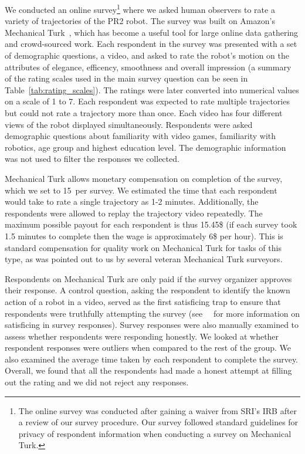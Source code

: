 \documentclass[letterpaper, 10 pt, conference]{ieeeconf}  %
\begin{document}
We conducted an online survey\footnote{The online survey was conducted after gaining a waiver from SRI's IRB after a review of our survey procedure. Our survey followed standard guidelines for privacy of respondent information when conducting a survey on Mechanical Turk.} where we asked human observers to rate a variety of trajectories of the PR2 robot. The survey was built on Amazon's Mechanical Turk~\cite{paolacci2010running}, which has become a useful tool for large online data gathering and crowd-sourced work. Each respondent in the survey was presented with a set of demographic questions, a video, and asked to rate the robot's motion on the attributes  of elegance, efficency, smoothness and overall impression (a summary of the rating scales used in the main survey question can be seen in Table~\ref{tab:rating_scales}). The ratings were later converted into numerical values on a scale of 1 to 7. Each respondent was expected to rate multiple trajectories but could not rate a trajectory more than once. Each video has four different views of the robot displayed simultaneously. Respondents were asked demographic questions about familiarity with video games, familiarity with robotics, age group and highest education level. The demographic information was not used to filter the responses we collected.  

Mechanical Turk allows monetary compensation on completion of the survey, which we set to 15\textcent~per survey. We estimated the time that each respondent would take to rate a single trajectory as 1-2 minutes. Additionally, the respondents were allowed to replay the trajectory video repeatedly. The maximum possible payout for each respondent is thus 15.45\$ (if each survey took 1.5 minutes to complete then the wage is approximately 6\$ per hour). This is standard compensation for quality work on Mechanical Turk for tasks of this type, as was pointed out to us by several veteran Mechanical Turk surveyors. 

Respondents on Mechanical Turk are only paid if the survey organizer approves their response. A control question, asking the respondent to identify the known action of a robot in a video, served as the first satisficing trap to ensure that respondents were truthfully attempting the survey (see~\cite{krosnick1991response}~\cite{krosnick1996satisficing} for more information on satisficing in survey responses). Survey responses were also manually examined to assess whether respondents were responding honestly. We looked at whether respondent responses were outliers when compared to the rest of the group. We also examined the average time taken by each respondent to complete the survey. Overall, we found that all the respondents had made a honest attempt at filling out the rating and we did not reject any responses. 
\end{document}
